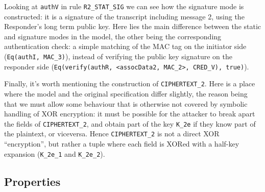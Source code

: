 Looking at \lstinline{authV} in rule \lstinline{R2_STAT_SIG} we can
see how the signature mode is constructed: it is a signature of the
transcript including message 2, using the Responder's long term public
key.
%
Here lies the main difference between the static and signature modes
in the model, the other being the corresponding authentication check:
a simple matching of the MAC tag on the initiator side
%
(\lstinline{Eq(authI, MAC_3)}), instead of verifying the public key
signature on the responder side
%
(\lstinline{Eq(verify(authR, <assocData2, MAC_2>, CRED_V), true)}).

Finally, it's worth mentioning the construction of
\lstinline{CIPHERTEXT_2}.
%
Here is a place where the model and the original specification differ
slightly, the reason being that we must allow some behaviour that is
otherwise not covered by symbolic handling of XOR encryption: it must
be possible for the attacker to break apart the fields of
\lstinline{CIPHERTEXT_2}, and obtain part of the key \lstinline{K_2e}
if they know part of the plaintext, or viceversa.
%
Hence \lstinline{CIPHERTEXT_2} is not a direct XOR ``encryption'', but
rather a tuple where each field is XORed with a half-key expansion
(\lstinline{K_2e_1} and \lstinline{K_2e_2}).



\subsection{Properties}
\label{sec:properties}

